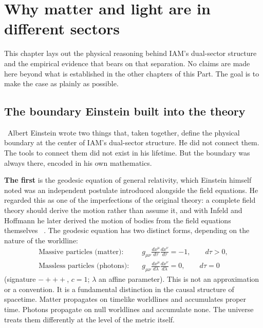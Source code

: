 \chapter{Why matter and light are in different sectors}\label{ch:dsnote}

This chapter lays out the physical reasoning behind IAM's dual-sector structure and the empirical evidence that bears on that separation. No claims are
made here beyond what is established in the other chapters of this Part. The goal is to make the case as plainly as possible.

\section{The boundary Einstein built into the theory}\label{sec:dsn_boundary}
\interp\ Albert Einstein wrote two things that, taken together, define the physical boundary at the center of IAM's dual-sector structure. He did not
connect them. The tools to connect them did not exist in his lifetime. But the boundary was always there, encoded in his own mathematics.

\textbf{The first} is the geodesic equation of general relativity, which Einstein himself noted was an independent postulate introduced alongside the
field equations. He regarded this as one of the imperfections of the original theory: a complete field theory should derive the motion rather than
assume it, and with Infeld and Hoffmann he later derived the motion of bodies from the field equations themselves~\cite{Einstein1938} \observed. The
geodesic equation has two distinct forms, depending on the nature of the worldline:
\begin{align}
\text{Massive particles (matter):}\quad & g_{\mu\nu}\frac{dx^\mu}{d\tau}\frac{dx^\nu}{d\tau}=-1,\qquad d\tau>0, \label{eq:dsn_timelike}\\
\text{Massless particles (photons):}\quad & g_{\mu\nu}\frac{dx^\mu}{d\lambda}\frac{dx^\nu}{d\lambda}=0,\qquad d\tau=0 \label{eq:dsn_null}
\end{align}
(signature $-+++$, $c=1$; $\lambda$ an affine parameter). This is not an approximation or a convention. It is a fundamental distinction in the causal
structure of spacetime. Matter propagates on timelike worldlines and accumulates proper time. Photons propagate on null worldlines and accumulate none.
The universe treats them differently at the level of the metric itself.


